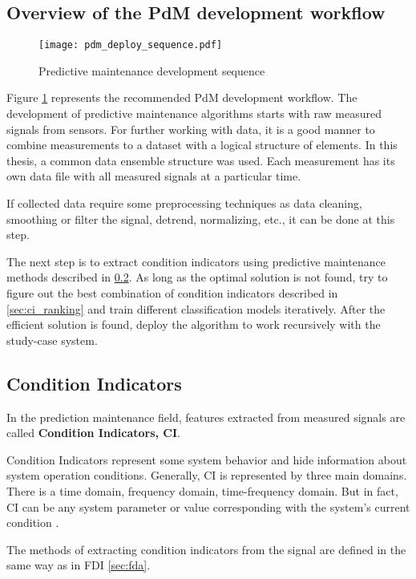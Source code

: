 \subsection{Overview of the PdM development workflow}

\begin{figure}[h!]
    \centering
    \texttt{[image: pdm\_deploy\_sequence.pdf]}
    \caption{Predictive maintenance development sequence}
    \label{fig:pdm_dev_seq}
\end{figure}


Figure \ref{fig:pdm_dev_seq} represents the recommended PdM development
workflow.  The development of predictive maintenance algorithms starts with
raw measured signals from sensors. For further working with data, it is a
good manner to combine measurements to a dataset with a logical structure
of elements. In this thesis, a common data ensemble structure was used.
Each measurement has its own data file with all measured signals at a
particular time. 


If collected data require some preprocessing techniques as data cleaning,
smoothing or filter the signal, detrend, normalizing, etc., it can be done
at this step. 

The next step is to extract condition indicators using predictive
maintenance methods described in \ref{sec:ci}. As long as the optimal
solution is not found, try to figure out the best combination of condition
indicators described in \ref{sec:ci_ranking} and train different
classification models iteratively.  After the efficient solution is found,
deploy the algorithm to work recursively with the study-case system.


\subsection{Condition Indicators}\label{sec:ci}
In the prediction maintenance field, features extracted from measured
signals are called \textbf{Condition Indicators, CI}. 

Condition Indicators
represent some system behavior and hide information about system operation
conditions.  Generally, CI is represented by three main domains. There is a
time domain, frequency domain, time-frequency domain. But in fact, CI can
be any system parameter or value corresponding with the system's current
condition \cite{matlab_full}.

The methods of extracting condition indicators from the signal are defined
in the same way as in FDI \ref{sec:fda}. 

